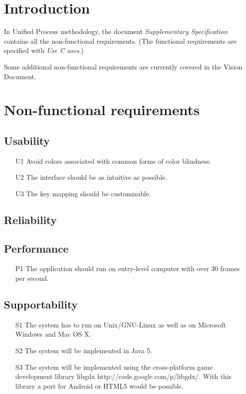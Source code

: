 \documentclass[fontsize=12pt,
               paper=a4,
               twoside=false,
               parskip=half,
               ]{scrartcl}
\begin{document}
\newcommand{\doctitle}{Supplementary Specification}


\tableofcontents

\section{Introduction}
In Unified Process methodology, the document \emph{Supplementary Specification} contains all the non-functional requirements. (The functional requirements are specified with \emph{Use C	ases}.)

Some additional non-functional requirements are currently covered in the Vision Document.

\section{Non-functional requirements}

\subsection{Usability}
\begin{itemize}
\item[U1] Avoid colors associated with common forms of color blindness.
\item[U2] The interface should be as intuitive as possible.
\item[U3] The key mapping should be customizable.
\end{itemize}


\subsection{Reliability}	

\subsection{Performance}

\begin{itemize}
\item[P1] The application should run on entry-level computer with over 30 frames per second.
\end{itemize}

\subsection{Supportability}

\begin{itemize}
	\item[S1] The system has to run on Unix/GNU-Linux as well as on Microsoft Windows and Mac OS X.	
	\item[S2] The system will be implemented in Java 5.
	\item[S3] The system will be implemented using the cross-platform game development library libgdx http://code.google.com/p/libgdx/. With this library a port for Android or HTML5 would be possible.
\end{itemize}
\end{document}
